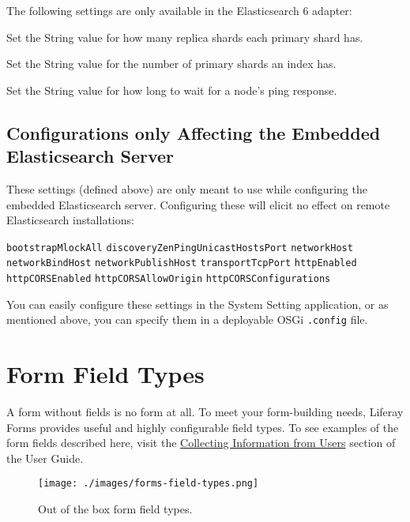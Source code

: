 The following settings are only available in the Elasticsearch 6
adapter:

\begin{description}
\tightlist
\item[\texttt{indexNumberOfReplicas=}]
Set the String value for how many replica shards each primary shard has.
\item[\texttt{indexNumberOfShards=}]
Set the String value for the number of primary shards an index has.
\item[\texttt{clientTransportPingTimeout=}]
Set the String value for how long to wait for a node's ping response.
\end{description}

\subsection{Configurations only Affecting the Embedded Elasticsearch
Server}\label{configurations-only-affecting-the-embedded-elasticsearch-server}

These settings (defined above) are only meant to use while configuring
the embedded Elasticsearch server. Configuring these will elicit no
effect on remote Elasticsearch installations:

\texttt{bootstrapMlockAll} \texttt{discoveryZenPingUnicastHostsPort}
\texttt{networkHost} \texttt{networkBindHost}
\texttt{networkPublishHost} \texttt{transportTcpPort}
\texttt{httpEnabled} \texttt{httpCORSEnabled}
\texttt{httpCORSAllowOrigin} \texttt{httpCORSConfigurations}

You can easily configure these settings in the System Setting
application, or as mentioned above, you can specify them in a deployable
OSGi \texttt{.config} file.

\section{Form Field Types}\label{form-field-types}

A form without fields is no form at all. To meet your form-building
needs, Liferay Forms provides useful and highly configurable field
types. To see examples of the form fields described here, visit the
\href{/docs/7-0/user/-/knowledge_base/u/collecting-information-from-users}{Collecting
Information from Users} section of the User Guide.

\begin{figure}
\centering
\texttt{[image: ./images/forms-field-types.png]}
\caption{Out of the box form field types.}
\end{figure}

